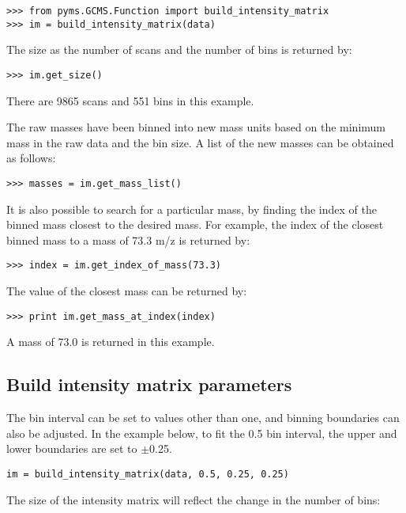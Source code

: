 \begin{verbatim}
>>> from pyms.GCMS.Function import build_intensity_matrix
>>> im = build_intensity_matrix(data)
\end{verbatim}

The size as the number of scans and the number of bins is returned by:
\begin{verbatim}
>>> im.get_size()
\end{verbatim}

There are 9865 scans and 551 bins in this example.

The raw masses have been binned into new mass units based on the minimum mass
in the raw data and the bin size. A list of the new masses can be obtained
as follows:

\begin{verbatim}
>>> masses = im.get_mass_list()
\end{verbatim}

It is also possible to search for a particular mass, by finding the index of the
binned mass closest to the desired mass. For example, the index of the closest
binned mass to a mass of 73.3 m/z is returned by:

\begin{verbatim}
>>> index = im.get_index_of_mass(73.3)
\end{verbatim}

The value of the closest mass can be returned by:

\begin{verbatim}
>>> print im.get_mass_at_index(index)
\end{verbatim}

A mass of 73.0 is returned in this example.

\subsection{Build intensity matrix parameters}


The bin interval can be set to values other than one, and binning boundaries
can also be adjusted. In the example below, to fit the 0.5 bin interval, the
upper and lower boundaries are set to $\pm$0.25.

\begin{verbatim}
im = build_intensity_matrix(data, 0.5, 0.25, 0.25)
\end{verbatim}

The size of the intensity matrix will reflect the change in the number of bins:

